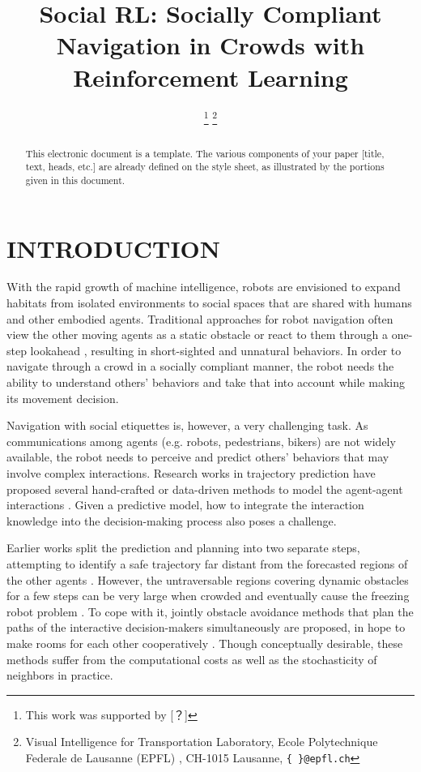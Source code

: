 \documentclass[letterpaper, 10 pt, conference]{ieeeconf}  %
\title{\Large \bf Social RL: Socially Compliant Navigation in Crowds
with Reinforcement Learning}
\author{%
\thanks{This work was supported by [？]}%
\thanks{Visual Intelligence for Transportation Laboratory, Ecole Polytechnique Federale de Lausanne (EPFL)
, CH-1015 Lausanne,
        {\tt\small \{ \}@epfl.ch}}%
}
\begin{document}

\maketitle
\thispagestyle{empty}
\pagestyle{empty}

\begin{abstract}
This electronic document is a template. The various components of your paper [title, text, heads, etc.] are already defined on the style sheet, as illustrated by the portions given in this document.

\vspace{5cm}

\end{abstract}


\section{INTRODUCTION} \label{sec:intro}

With the rapid growth of machine intelligence, robots are envisioned to expand habitats from isolated environments to social spaces that are shared with humans and other embodied agents. Traditional approaches for robot navigation often view the other moving agents as a static obstacle \cite{fox_dynamic_1997} or react to them through a one-step lookahead \cite{berg_reciprocal_2008}, resulting in short-sighted and unnatural behaviors. In order to navigate through a crowd in a socially compliant manner, the robot needs the ability to understand others' behaviors and take that into account while making its movement decision. 

Navigation with social etiquettes is, however, a very challenging task. As communications among agents (e.g. robots, pedestrians, bikers) are not widely available, the robot needs to perceive and predict others' behaviors that may involve complex interactions. Research works in trajectory prediction have proposed several hand-crafted or data-driven methods to model the agent-agent interactions \cite{helbing_social_1995,alahi_social_2016,vemula_social_2017,gupta_social_2018}. 
Given a predictive model, how to integrate the interaction knowledge into the decision-making process also poses a challenge. 

Earlier works split the prediction and planning into two separate steps, attempting to identify a safe trajectory far distant from the forecasted regions of the other agents \cite{bennewitz_learning_2005,aoude_probabilistically_2013}. However, the untraversable regions covering dynamic obstacles for a few steps can be very large when crowded and eventually cause the freezing robot problem \cite{trautman_unfreezing_2010}. To cope with it, jointly obstacle avoidance methods that plan the paths of the interactive decision-makers simultaneously are proposed, in hope to make rooms for each other cooperatively \cite{trautman_unfreezing_2010}. Though conceptually desirable, these methods suffer from the computational costs as well as the stochasticity of neighbors in practice. 
\end{document}
